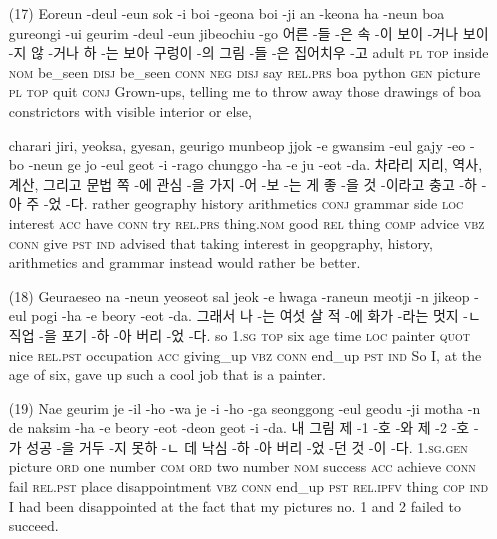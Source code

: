 \begin{itemize}
\item [(17)]
\tgl
		{Eoreun -deul -eun sok -i boi -geona boi -ji an -keona ha -neun boa gureongi -ui geurim -deul -eun jibeochiu -go}
		{어른 -들 -은 속 -이 보이 -거나 보이 -지 않 -거나 하 -는 보아 구렁이 -의 그림 -들 -은 집어치우 -고}
		{adult	\textsc{pl}	\textsc{top}	inside	\textsc{nom}	be\_seen	\textsc{disj}	be\_seen	\textsc{conn}	\textsc{neg}	\textsc{disj}	say	\textsc{rel.prs}	boa	python	\textsc{gen}	picture	\textsc{pl}	\textsc{top}	quit	\textsc{conj}}
		{Grown-ups, telling me to throw away those drawings of boa constrictors with visible interior or else,}

\tgl
		{charari jiri, yeoksa, gyesan, geurigo munbeop jjok -e gwansim -eul gajy -eo -bo -neun ge jo -eul geot -i -rago chunggo -ha -e ju -eot -da.}
		{차라리 지리, 역사, 계산, 그리고 문법 쪽 -에 관심 -을 가지 -어 -보 -는 게 좋 -을 것 -이라고 충고 -하 -아 주 -었 -다.}
		{rather	geography	history	arithmetics	\textsc{conj}	grammar	side	\textsc{loc}	interest	\textsc{acc}	have	\textsc{conn}	try	\textsc{rel.prs}	thing.\textsc{nom}	good	\textsc{rel}	thing	\textsc{comp}	advice	\textsc{vbz}	\textsc{conn}	give	\textsc{pst}	\textsc{ind}}
		{advised that taking interest in geopgraphy, history, arithmetics and grammar instead would rather be better.}

\item [(18)]
\tgl
		{Geuraeseo na -neun yeoseot sal jeok -e hwaga -raneun meotji -n jikeop -eul pogi -ha -e beory -eot -da.}
		{그래서 나 -는 여섯 살 적 -에 화가 -라는 멋지 -ㄴ 직업 -을 포기 -하 -아 버리 -었 -다.}
		{so	\textsc{1.sg}	\textsc{top}	six	age	time	\textsc{loc} 	painter	\textsc{quot}	nice	\textsc{rel.pst}	occupation	\textsc{acc}	giving\_up	\textsc{vbz}	\textsc{conn}	end\_up	\textsc{pst}	\textsc{ind}}
		{So I, at the age of six, gave up such a cool job that is a painter.}

\item [(19)]
\tgl
		{Nae geurim je -il -ho -wa je -i -ho -ga seonggong -eul geodu -ji motha -n de naksim -ha -e beory -eot -deon geot -i -da.}
		{내 그림 제 -1 -호 -와 제 -2 -호 -가 성공 -을 거두 -지 못하 -ㄴ 데 낙심 -하 -아 버리 -었 -던 것 -이 -다.}
		{\textsc{1.sg.gen}	picture	\textsc{ord}	one	number	\textsc{com} \textsc{ord}	two	number	\textsc{nom}	success	\textsc{acc}	achieve	\textsc{conn}	fail	\textsc{rel.pst}	place	disappointment	\textsc{vbz}	\textsc{conn}	end\_up	\textsc{pst}	\textsc{rel.ipfv}	thing	\textsc{cop}	\textsc{ind}}
		{I had been disappointed at the fact that my pictures no. 1 and 2 failed to succeed.}


\end{itemize}
